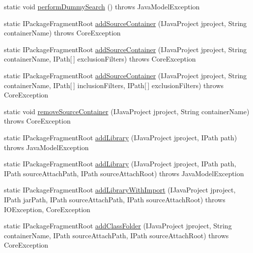 \begin{DoxyCompactItemize}
\item 
static void \hyperlink{classorg_1_1eclipse_1_1jdt_1_1ui_1_1tests_1_1refactoring_1_1infra_1_1JavaProjectHelper_a0e82eb3a6de8503e44d0a1775fb9623d}{performDummySearch} ()  throws JavaModelException 
\item 
static IPackageFragmentRoot \hyperlink{classorg_1_1eclipse_1_1jdt_1_1ui_1_1tests_1_1refactoring_1_1infra_1_1JavaProjectHelper_a8008eaafbd39eb06ab3c6b874ebd9484}{addSourceContainer} (IJavaProject jproject, String containerName)  throws CoreException 
\item 
static IPackageFragmentRoot \hyperlink{classorg_1_1eclipse_1_1jdt_1_1ui_1_1tests_1_1refactoring_1_1infra_1_1JavaProjectHelper_ace1239a14d7b65c4287fa93bcf59e76c}{addSourceContainer} (IJavaProject jproject, String containerName, IPath\mbox{[}$\,$\mbox{]} exclusionFilters)  throws CoreException 
\item 
static IPackageFragmentRoot \hyperlink{classorg_1_1eclipse_1_1jdt_1_1ui_1_1tests_1_1refactoring_1_1infra_1_1JavaProjectHelper_a82d933ec9c5428ddbfd959164c55639a}{addSourceContainer} (IJavaProject jproject, String containerName, IPath\mbox{[}$\,$\mbox{]} inclusionFilters, IPath\mbox{[}$\,$\mbox{]} exclusionFilters)  throws CoreException 
\item 
static void \hyperlink{classorg_1_1eclipse_1_1jdt_1_1ui_1_1tests_1_1refactoring_1_1infra_1_1JavaProjectHelper_a4175c17b9c618d32ec2971208da64e44}{removeSourceContainer} (IJavaProject jproject, String containerName)  throws CoreException 
\item 
static IPackageFragmentRoot \hyperlink{classorg_1_1eclipse_1_1jdt_1_1ui_1_1tests_1_1refactoring_1_1infra_1_1JavaProjectHelper_ad5f22d81a4e9791fbdd1aae0f2d10944}{addLibrary} (IJavaProject jproject, IPath path)  throws JavaModelException 
\item 
static IPackageFragmentRoot \hyperlink{classorg_1_1eclipse_1_1jdt_1_1ui_1_1tests_1_1refactoring_1_1infra_1_1JavaProjectHelper_a82fc7893776a175c970887bc7323e31f}{addLibrary} (IJavaProject jproject, IPath path, IPath sourceAttachPath, IPath sourceAttachRoot)  throws JavaModelException 
\item 
static IPackageFragmentRoot \hyperlink{classorg_1_1eclipse_1_1jdt_1_1ui_1_1tests_1_1refactoring_1_1infra_1_1JavaProjectHelper_a20d5c750bf46195dc94e15790258fa92}{addLibraryWithImport} (IJavaProject jproject, IPath jarPath, IPath sourceAttachPath, IPath sourceAttachRoot)  throws IOException, CoreException 
\item 
static IPackageFragmentRoot \hyperlink{classorg_1_1eclipse_1_1jdt_1_1ui_1_1tests_1_1refactoring_1_1infra_1_1JavaProjectHelper_a47c45b1af3293b1f5db87cce3b892152}{addClassFolder} (IJavaProject jproject, String containerName, IPath sourceAttachPath, IPath sourceAttachRoot)  throws CoreException 

\end{DoxyCompactItemize}

